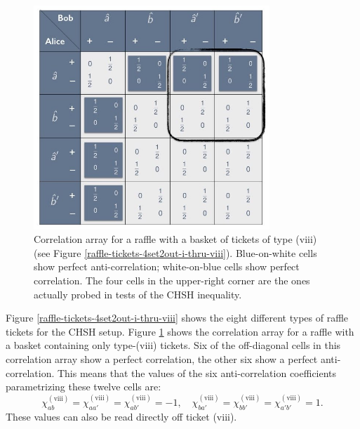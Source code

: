 \begin{figure}[ht]
 \centering
   \includegraphics[width=3.5in]{CA-4set2out-raffle-viii.jpeg} 
   \caption{Correlation array for a raffle with a basket of tickets of type (viii) (see Figure \ref{raffle-tickets-4set2out-i-thru-viii}). Blue-on-white cells show perfect anti-correlation; white-on-blue cells show perfect correlation. The four cells in the upper-right corner are the ones actually probed in tests of the CHSH inequality.}
   \label{CA-4set2out-raffle-viii}
\end{figure}

Figure \ref{raffle-tickets-4set2out-i-thru-viii} shows the eight different types of raffle tickets for the CHSH setup. Figure \ref{CA-4set2out-raffle-viii} shows the correlation array for a raffle with a basket containing only type-(viii) tickets. Six of the off-diagonal cells in this correlation array show a perfect correlation, the other six show a perfect anti-correlation. This means that the values of the six anti-correlation coefficients parametrizing these twelve cells are:
\begin{equation}
\chi_{ab}^{\mathrm{(viii)}} = \chi_{aa'}^{\mathrm{(viii)}} = \chi_{ab'}^{\mathrm{(viii)}} = -1, \quad \chi_{ba'}^{\mathrm{(viii)}} = \chi_{bb'}^{\mathrm{(viii)}} = \chi_{a'b'}^{\mathrm{(viii)}} = 1.
\label{chi values for ticket (viii)}
\end{equation}
These values can also be read directly off ticket (viii).  

